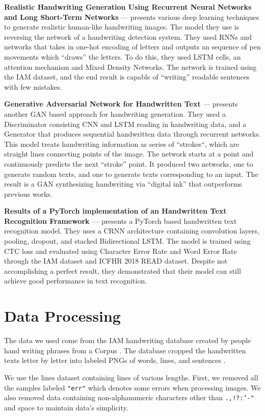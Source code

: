 \documentclass{article} %
\begin{document}
    {\bf Realistic Handwriting Generation Using Recurrent Neural Networks and Long Short-Term Networks} --- \citep{inbook} presents various deep learning techniques to generate realistic human-like handwriting images. The model they use is reversing the network of a handwriting detection system. They used RNNs and networks that takes in one-hot encoding of letters and outputs an sequence of pen movements which ``draws'' the letters. To do this, they used LSTM cells, an attention mechanism and Mixed Density Networks. The network is trained using the IAM dataset, and the end result is capable of ``writing'' readable sentences with few mistakes.

    {\bf Generative Adversarial Network for Handwritten Text} --- \citep{DBLP:journals/corr/abs-1907-11845} presents another GAN based approach for handwriting generation. They used a Discriminator consisting CNN and LSTM reading in handwriting data, and a Generator that produces sequential handwritten data through recurrent networks. This model treats handwriting information as series of ``strokes``, which are straight lines connecting points of the image. The network starts at a point and continuously predicts the next ``stroke'' point. It produced two networks, one to generate random texts, and one to generate texts corresponding to an input. The result is a GAN synthesizing handwriting via ``digital ink'' that outperforms previous works.

    {\bf Results of a PyTorch implementation of an Handwritten Text Recognition Framework} --- \citep{fr-crnn} presents a PyTorch based handwritten text recognition model. They uses a CRNN architecture containing convolution layers, pooling, dropout, and stacked Bidirectional LSTM. The model is trained using CTC loss and evaluated using Character Error Rate and Word Error Rate through the IAM dataset and ICFHR 2018 READ dataset. Despite not accomplishing a perfect result, they demonstrated that their model can still achieve good performance in text recognition.

\section{Data Processing}
The data we used come from the IAM handwriting database \citep{Marti1999AFE} created by people hand writing phrases from a Corpus \citep{corpus}. The database cropped the handwritten texts letter by letter into labeled PNGs of words, lines, and sentences \citep{iamdb}.

We use the lines dataset containing lines of various lengths. First, we removed all the samples labeled \texttt{"err"} which denotes some errors when processing images. We also removed data containing non-alphanumeric characters other than \texttt{.,!?:'-"} and space to maintain data's simplicity.
\end{document}
